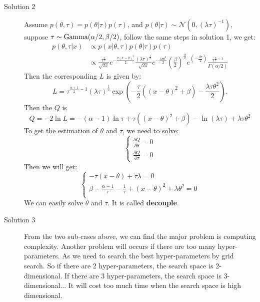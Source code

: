 \documentclass[11pt]{article}
\def\MN{{\mathcal N}}
\begin{document}
\begin{description}
\begin{description}
\item[Solution 2] Assume $p(\theta, \tau)=p(\theta|\tau)p(\tau)$, and $p(\theta |\tau) \sim \MN(0, (\lambda\tau)^{-1})$, suppose $\tau \thicksim \mbox{Gamma}(\alpha/2, \beta/2)$, follow the same steps in solution 1, we get:
\[\begin{split}
p(\theta, \tau | x) &\propto p(x | \theta, \tau) p(\theta | \tau) p(\tau) \\
&\propto \frac{\tau^{\frac{1}{2}}}{\sqrt{2\pi}} e^{-\frac{\tau(x-\theta)^2}{2}}
\frac{(\lambda \tau)^{\frac{1}{2}}}{\sqrt{2\pi}} e^{-\frac{\lambda\tau\theta^2}{2}}
(\frac{\beta}{2})^\frac{\alpha}{2}e^{(-\frac{\beta \tau}{2})}\frac{\tau ^{\frac{\alpha}{2} - 1}}{\Gamma(\alpha/2)}
\end{split}
\]
Then the corresponding $L$ is given by:
    $$L = \tau^{\frac{\alpha+1}{2}-1}(\lambda\tau)^\frac{1}{2}\exp(-\frac{\tau}{2}((x-\theta)^2+\beta)-\frac{\lambda\tau\theta^2}{2}).$$
Then the $Q$ is
$$Q = -2\ln L = -(\alpha - 1)\ln\tau + \tau((x-\theta)^2+\beta) - \ln(\lambda\tau) + \lambda\tau\theta^2$$
To get the estimation of $\theta$ and $\tau$, we need to solve:
\[\begin{cases}
\frac{\partial Q}{\partial \theta} = 0 \\
\frac{\partial Q}{\partial \tau} = 0
\end{cases}
\]
Then we will get:
\begin{equation*} \begin{cases}
-\tau(x-\theta)+\tau\lambda = 0  \\
\beta - \frac{\alpha - 1}{\tau} - \frac{1}{\tau}+(x-\theta)^2 + \lambda\theta^2= 0 \\
\end{cases}
\end{equation*}
We can easily solve $\theta$ and $\tau$. It is called \textbf{decouple}.

\item[Solution 3] From the two sub-cases above, we can find the major problem is computing complexity. Another problem will occurs if there are too many hyper-parameters. As we need to search the best hyper-parameters by grid search. So if there are 2 hyper-parameters, the search space is 2-dimensional. If there are 3 hyper-parameters, the search space is 3-dimensional... It will cost too much time when the search space is high dimensional.


\end{description}
\end{description}
\end{document}
